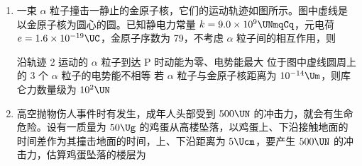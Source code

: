 \documentclass[\gkver]{gaokaozhenti}
\begin{document}
\begin{enumerate}
{而路灯连续一周的耗电量为 $W = Pt = 0.06\UkW \times 7 \times 10\Uh = 4.2\UkWh$

因 $9.6\UkWh > 4.2\UkWh$，所以储能电池充满电后，即使连续一周无风且阴雨，路灯也能正常工作。故 D 正确。

故选 D。
}

\item
一束 $\alpha$ 粒子撞击一静止的金原子核，它们的运动轨迹如图所示。图中虚线是以金原子核为圆心的圆。已知静电力常量 $k = 9.0 \times 10^{9}\UNmqCq$，元电荷 $e = 1.6 \times 10^{-19}\UC$，金原子序数为 79，不考虑 $\alpha$ 粒子间的相互作用，则


{沿轨迹 2 运动的 $\alpha$ 粒子到达 P 时动能为零、电势能最大}
{位于图中虚线圆周上的 3 个 $\alpha$ 粒子的电势能不相等}
{若 $\alpha$ 粒子与金原子核距离为 $10^{-14}\Um$，则库仑力数量级为 $10^{2}\UN$}


\item
高空抛物伤人事件时有发生，成年人头部受到 $500\UN$ 的冲击力，就会有生命危险。设有一质量为 $50\Ug$ 的鸡蛋从高楼坠落，以鸡蛋上、下沿接触地面的时间差作为其撞击地面的时间，上、下沿距离为 $5\Ucm$，要产生 $500\UN$ 的冲击力，估算鸡蛋坠落的楼层为


\end{enumerate}
\end{document}
